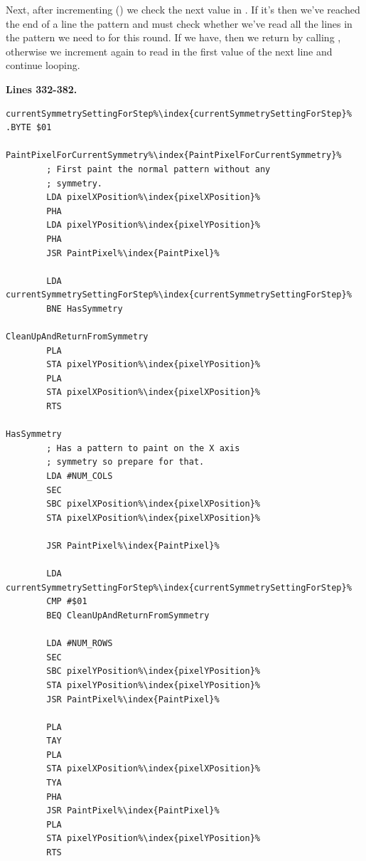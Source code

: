 Next, after incrementing  () we check the next value in . If it's  then
we've reached the end of a line the pattern and must check whether we've read all the lines in the pattern we need to for this
round. If we have, then we return by calling , otherwise we increment  again to read
in the first value of the next line and continue looping.

\clearpage
\textbf{Lines 332-382. }
\begin{lstlisting}[caption=Choosing what to paint based on the current symmetry setting.,escapechar=\%]
currentSymmetrySettingForStep%\index{currentSymmetrySettingForStep}%   .BYTE $01

PaintPixelForCurrentSymmetry%\index{PaintPixelForCurrentSymmetry}%   
        ; First paint the normal pattern without any
        ; symmetry.
        LDA pixelXPosition%\index{pixelXPosition}%
        PHA 
        LDA pixelYPosition%\index{pixelYPosition}%
        PHA 
        JSR PaintPixel%\index{PaintPixel}%

        LDA currentSymmetrySettingForStep%\index{currentSymmetrySettingForStep}%
        BNE HasSymmetry

CleanUpAndReturnFromSymmetry   
        PLA 
        STA pixelYPosition%\index{pixelYPosition}%
        PLA 
        STA pixelXPosition%\index{pixelXPosition}%
        RTS 

HasSymmetry   
        ; Has a pattern to paint on the X axis
        ; symmetry so prepare for that.
        LDA #NUM_COLS
        SEC 
        SBC pixelXPosition%\index{pixelXPosition}%
        STA pixelXPosition%\index{pixelXPosition}%

        JSR PaintPixel%\index{PaintPixel}%

        LDA currentSymmetrySettingForStep%\index{currentSymmetrySettingForStep}%
        CMP #$01
        BEQ CleanUpAndReturnFromSymmetry

        LDA #NUM_ROWS
        SEC 
        SBC pixelYPosition%\index{pixelYPosition}%
        STA pixelYPosition%\index{pixelYPosition}%
        JSR PaintPixel%\index{PaintPixel}%

        PLA 
        TAY 
        PLA 
        STA pixelXPosition%\index{pixelXPosition}%
        TYA 
        PHA 
        JSR PaintPixel%\index{PaintPixel}%
        PLA 
        STA pixelYPosition%\index{pixelYPosition}%
        RTS 

\end{lstlisting}
\clearpage

